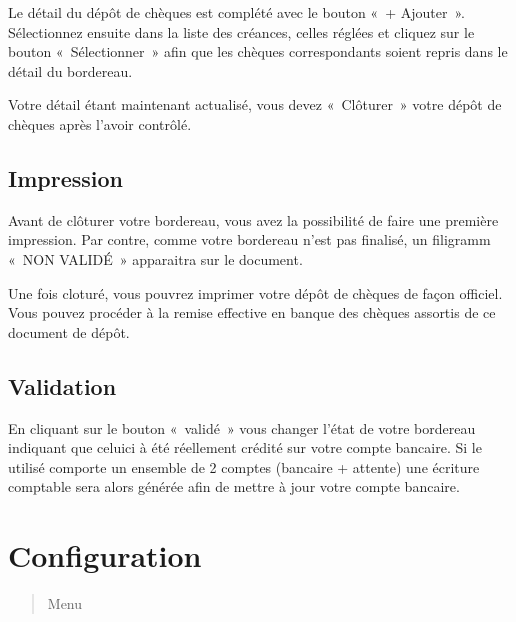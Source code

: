 \documentclass[a4paper,10pt,oneside,french]{sphinxmanual}
\begin{document}
\sphinxAtStartPar
Le détail du dépôt de chèques est complété avec le bouton « + Ajouter ».
Sélectionnez ensuite dans la liste des créances, celles réglées et cliquez sur le bouton « Sélectionner » afin que les chèques correspondants soient repris dans le détail du bordereau.
\begin{quote}

\noindent{}
\end{quote}

\sphinxAtStartPar
Votre détail étant maintenant actualisé, vous devez « Clôturer » votre dépôt de chèques après l’avoir contrôlé.


\subsection{Impression}
\label{\detokenize{payoff/deposit:impression}}
\sphinxAtStartPar
Avant de clôturer votre bordereau, vous avez la possibilité de faire une première impression.
Par contre, comme votre bordereau n’est pas finalisé, un filigramm « NON VALIDÉ » apparaitra sur le document.

\sphinxAtStartPar
Une fois cloturé, vous pouvrez imprimer votre dépôt de chèques de façon officiel.
Vous pouvez procéder à la remise effective en banque des chèques assortis de ce document de dépôt.


\subsection{Validation}
\label{\detokenize{payoff/deposit:validation}}
\sphinxAtStartPar
En cliquant sur le bouton « validé » vous changer l’état de votre bordereau indiquant que celui\sphinxhyphen{}ci à été réellement crédité sur votre compte bancaire.
Si le  utilisé comporte un ensemble de 2 comptes (bancaire + attente) une écriture comptable sera alors générée afin de mettre à jour votre compte bancaire.


\section{Configuration}
\label{\detokenize{payoff/config:configuration}}\label{\detokenize{payoff/config::doc}}\begin{quote}

\sphinxAtStartPar
Menu 
\end{quote}
\end{document}
